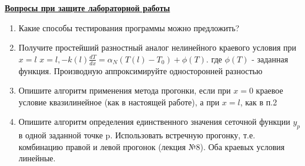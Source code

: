 \underline{\textbf{Вопросы при защите лабораторной работы}}\\
\begin{enumerate}
\item Какие способы тестирования программы можно предложить?

\item Получите простейший разностный аналог нелинейного краевого условия при $x = l$
$x = l, -k(l)\frac{dT}{dx} = \alpha_N(T(l) - T_0) + \phi(T).$
где $\phi(T)$ - заданная функция.
Производную аппроксимируйте односторонней разностью

\item Опишите алгоритм применения метода прогонки, если при $x = 0$ краевое условие квазилинейное (как в настоящей работе), а при $x = l$, как в п.2

\item  Опишите алгоритм определения единственного значения сеточной функции $y_p$ в одной заданной точке p. Использовать встречную прогонку, т.е. комбинацию правой и левой прогонок (лекция №8). Оба краевых условия линейные.

\end{enumerate}